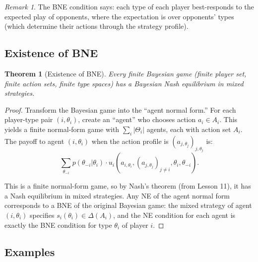 \documentclass[11pt,a4paper]{article}
\theoremstyle{definition}
\theoremstyle{plain}
\newtheorem{theorem}{Theorem}[section]
\theoremstyle{remark}
\newtheorem{remark}{Remark}[section]
\begin{document}
\begin{remark}
The BNE condition says: each type of each player best-responds to the expected play of
opponents, where the expectation is over opponents' types (which determine their actions
through the strategy profile).
\end{remark}

\subsection{Existence of BNE}

\begin{theorem}[Existence of BNE]
\label{thm:bne-existence}
Every finite Bayesian game (finite player set, finite action sets, finite type spaces) has
a Bayesian Nash equilibrium in mixed strategies.
\end{theorem}

\begin{proof}
Transform the Bayesian game into the ``agent normal form.'' For each player-type pair
$(i, \theta_i)$, create an ``agent'' who chooses action $a_i \in A_i$. This yields a
finite normal-form game with $\sum_i |\Theta_i|$ agents, each with action set $A_i$.
The payoff to agent $(i, \theta_i)$ when the action profile is
$(a_{j,\theta_j})_{j,\theta_j}$ is:
\[
    \sum_{\theta_{-i}} p(\theta_{-i} | \theta_i) \cdot
    u_i(a_{i,\theta_i}, (a_{j,\theta_j})_{j \neq i}, \theta_i, \theta_{-i}).
\]

This is a finite normal-form game, so by Nash's theorem (from Lesson 11), it has a Nash
equilibrium in mixed strategies. Any NE of the agent normal form corresponds to a BNE of
the original Bayesian game: the mixed strategy of agent $(i, \theta_i)$ specifies
$s_i(\theta_i) \in \Delta(A_i)$, and the NE condition for each agent is exactly the BNE
condition for type $\theta_i$ of player $i$.
\end{proof}

\subsection{Examples}
\end{document}
